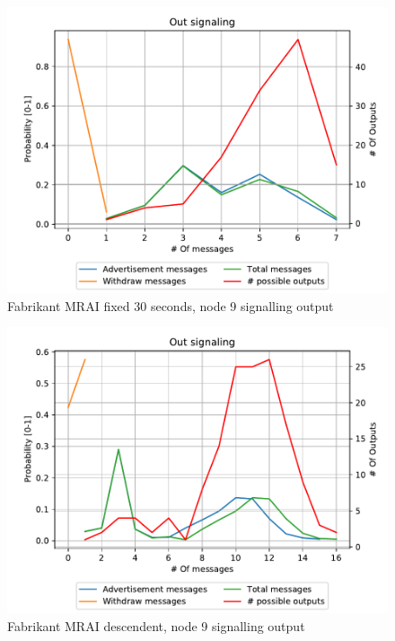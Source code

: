 \documentclass[10pt,conference,letterpaper]{IEEEtran}
\newcommand{\figwidth}{0.78}
\newcommand{\figvspace}{-1.5em}
\begin{document}
\begin{figure}[tb]
	\centering
	\includegraphics[width=\figwidth\columnwidth]{images/fabrikant/fabrikant-30fixed/results_9_signaling_nmessage_prob}
	\caption{Fabrikant MRAI fixed 30 seconds, node 9 signalling output}
	\label{fig:fabr_30sec_9_signaling}
	\vspace{\figvspace}
\end{figure}

\begin{figure}[tb]
	\centering
	\includegraphics[width=\figwidth\columnwidth]{images/fabrikant/fabrikant-descendent/results_9_signaling_nmessage_prob}
	\caption{Fabrikant MRAI descendent, node 9 signalling output}
	\label{fig:fabr_descendent_9_signaling}
	\vspace{\figvspace}
\end{figure}
\end{document}
